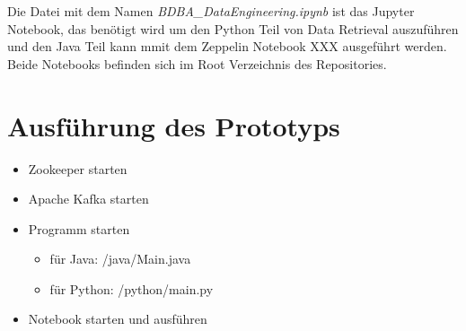 Die Datei mit dem Namen \textit{BDBA\_DataEngineering.ipynb} ist das Jupyter Notebook, das benötigt wird um den Python Teil von Data Retrieval auszuführen
und den Java Teil kann mmit dem Zeppelin Notebook XXX ausgeführt werden.
Beide Notebooks befinden sich im Root Verzeichnis des Repositories.

\section{Ausführung des Prototyps}
\begin{itemize}
  \item Zookeeper starten
  \item Apache Kafka starten
  \item Programm starten
  \begin{itemize}
    \item für Java: /java/Main.java
    \item für Python: /python/main.py
  \end{itemize}
  \item Notebook starten und ausführen
\end{itemize}
